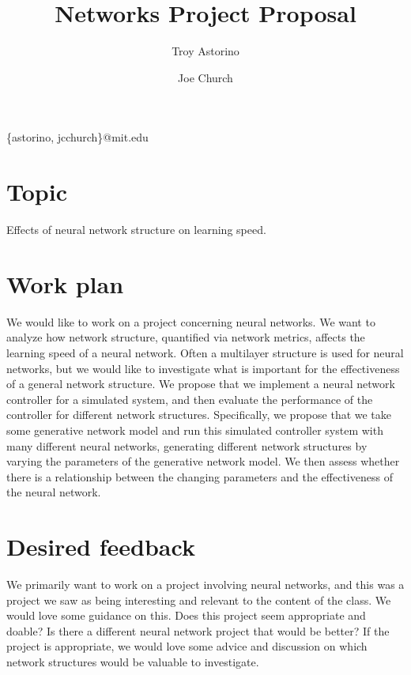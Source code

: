\documentclass{article}
\title{Networks Project Proposal}
\author{Troy Astorino \and Joe Church}
\date{\vspace{-2em}}
\begin{document}
\maketitle
\begin{center}
\{astorino, jcchurch\}@mit.edu
\end{center}

\section{Topic}
Effects of neural network structure on learning speed.

\section{Work plan}
We would like to work on a project concerning neural networks. We want to
analyze how network structure, quantified via network metrics, affects the
learning speed of a neural network. Often a multilayer structure is used for
neural networks, but we would like to investigate what is important for the
effectiveness of a general network structure. We propose that we implement a
neural network controller for a simulated system, and then evaluate the
performance of the controller for different network structures. Specifically, we
propose that we take some generative network model and run this simulated
controller system with many different neural networks, generating different
network structures by varying the parameters of the generative network model. We
then assess whether there is a relationship between the changing parameters and
the effectiveness of the neural network.

\section{Desired feedback}
We primarily want to work on a project involving neural networks, and this was a
project we saw as being interesting and relevant to the content of the class. We
would love some guidance on this. Does this project seem appropriate and doable?
Is there a different neural network project that would be better? If the project
is appropriate, we would love some advice and discussion on which network
structures would be valuable to investigate.
\end{document}
